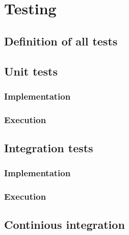 \chapter{Testing}

\section{Definition of all tests}

\section{Unit tests}
\subsection{Implementation}
\subsection{Execution}

\section{Integration tests}
\subsection{Implementation}
\subsection{Execution}

\section{Continious integration}